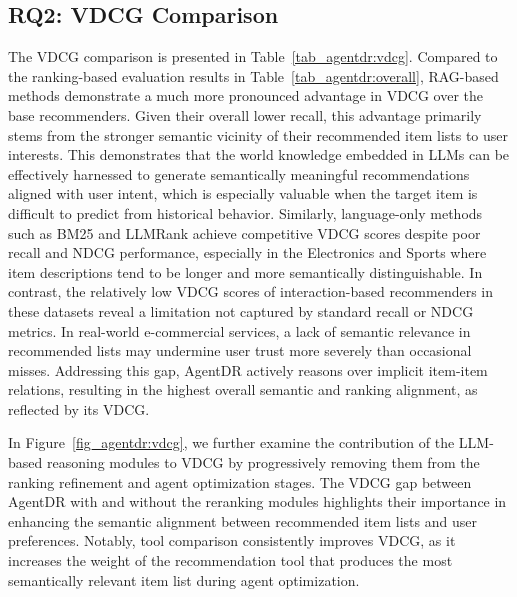 \subsection{RQ2: VDCG Comparison}
The VDCG comparison is presented in Table~\ref{tab_agentdr:vdcg}. Compared to the ranking-based evaluation results in Table~\ref{tab_agentdr:overall}, RAG-based methods demonstrate a much more pronounced advantage in VDCG over the base recommenders. Given their overall lower recall, this advantage primarily stems from the stronger semantic vicinity of their recommended item lists to user interests. This demonstrates that the world knowledge embedded in LLMs can be effectively harnessed to generate semantically meaningful recommendations aligned with user intent, which is especially valuable when the target item is difficult to predict from historical behavior.
Similarly, language-only methods such as BM25 and LLMRank achieve competitive VDCG scores despite poor recall and NDCG performance, especially in the Electronics and Sports where item descriptions tend to be longer and more semantically distinguishable. In contrast, the relatively low VDCG scores of interaction-based recommenders in these datasets reveal a limitation not captured by standard recall or NDCG metrics. In real-world e-commercial services, a lack of semantic relevance in recommended lists may undermine user trust more severely than occasional misses. Addressing this gap, AgentDR actively reasons over implicit item-item relations, resulting in the highest overall semantic and ranking alignment, as reflected by its VDCG.

In Figure~\ref{fig_agentdr:vdcg}, we further examine the contribution of the LLM-based reasoning modules to VDCG by progressively removing them from the ranking refinement and agent optimization stages. The VDCG gap between AgentDR with and without the reranking modules highlights their importance in enhancing the semantic alignment between recommended item lists and user preferences. Notably, tool comparison consistently improves VDCG, as it increases the weight of the recommendation tool that produces the most semantically relevant item list during agent optimization.


